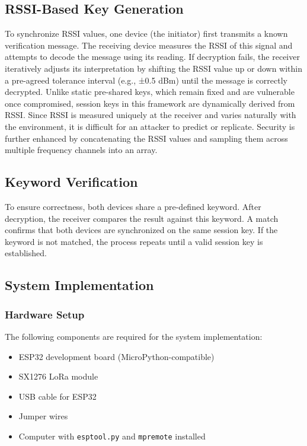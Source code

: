 \subsection{RSSI-Based Key Generation}
To synchronize RSSI values, one device (the initiator) first transmits a known verification message. The receiving device measures the RSSI of this signal and attempts to decode the message using its reading. If decryption fails, the receiver iteratively adjusts its interpretation by shifting the RSSI value up or down within a pre-agreed tolerance interval (e.g., ±0.5 dBm) until the message is correctly decrypted. Unlike static pre-shared keys, which remain fixed and are vulnerable once compromised, session keys in this framework are dynamically derived from RSSI. Since RSSI is measured uniquely at the receiver and varies naturally with the environment, it is difficult for an attacker to predict or replicate. Security is further enhanced by concatenating the RSSI values and sampling them across multiple frequency channels into an array. 

\subsection{Keyword Verification}
To ensure correctness, both devices share a pre-defined keyword. After decryption, the receiver compares the result against this keyword. A match confirms that both devices are synchronized on the same session key. If the keyword is not matched, the process repeats until a valid session key is established.

\subsection{System Implementation}

\subsubsection{Hardware Setup}
The following components are required for the system implementation:
\begin{itemize}
    \item ESP32 development board (MicroPython-compatible)
    \item SX1276 LoRa module
    \item USB cable for ESP32
    \item Jumper wires
    \item Computer with \texttt{esptool.py} and \texttt{mpremote} installed
\end{itemize}

